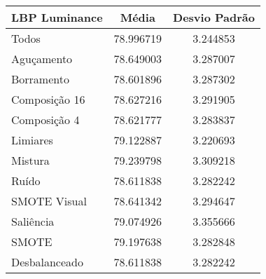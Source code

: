 \begin{table}[!htbp]
\centering
\caption{}
\label{tab:resultados:x:melhor}
\begin{tabular}{|l|c|c|}
\hline
\textbf{LBP Luminance} & \textbf{Média}     & \textbf{Desvio Padrão} \\ \hline
   Todos        &  78.996719 &  3.244853  \\ \hline
  Aguçamento    &  78.649003 &  3.287007  \\ \hline
  Borramento    &  78.601896 &  3.287302  \\ \hline
  Composição 16 &  78.627216 &  3.291905  \\ \hline
  Composição 4  &  78.621777 &  3.283837  \\ \hline
  Limiares      &  79.122887 &  3.220693  \\ \hline
  Mistura       &  79.239798 &  3.309218  \\ \hline
  Ruído         &  78.611838 &  3.282242  \\ \hline
  SMOTE Visual  &  78.641342 &  3.294647  \\ \hline
  Saliência     &  79.074926 &  3.355666  \\ \hline
 SMOTE          &  79.197638 &  3.282848  \\ \hline
Desbalanceado   &  78.611838 &  3.282242  \\ \hline
\end{tabular}
\end{table}




